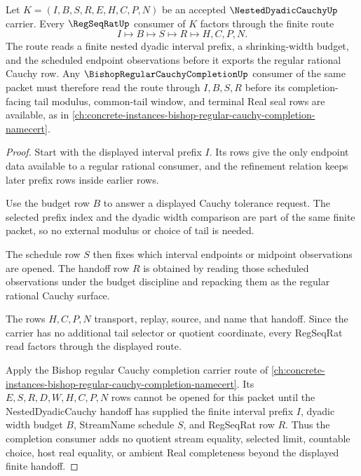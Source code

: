 \begin{theorem}
\label{thm:nested-dyadic-cauchy-regseqrat-handoff}
Let $K=(I,B,S,R,E,H,C,P,N)$ be an accepted $\NestedDyadicCauchyUp$ carrier. Every $\RegSeqRatUp$ consumer of $K$ factors through the finite route
$$
I\longmapsto B\longmapsto S\longmapsto R\longmapsto H,C,P,N .
$$
The route reads a finite nested dyadic interval prefix, a shrinking-width budget, and the scheduled endpoint observations before it exports the regular rational Cauchy row. Any $\BishopRegularCauchyCompletionUp$ consumer of the same packet must therefore read the route through $I,B,S,R$ before its completion-facing tail modulus, common-tail window, and terminal Real seal rows are available, as in \autoref{ch:concrete-instances-bishop-regular-cauchy-completion-namecert}.
\end{theorem}
\begin{proof}
Start with the displayed interval prefix $I$. Its rows give the only endpoint data available to a regular rational consumer, and the refinement relation keeps later prefix rows inside earlier rows.

Use the budget row $B$ to answer a displayed Cauchy tolerance request. The selected prefix index and the dyadic width comparison are part of the same finite packet, so no external modulus or choice of tail is needed.

The schedule row $S$ then fixes which interval endpoints or midpoint observations are opened. The handoff row $R$ is obtained by reading those scheduled observations under the budget discipline and repacking them as the regular rational Cauchy surface.

The rows $H,C,P,N$ transport, replay, source, and name that handoff. Since the carrier has no additional tail selector or quotient coordinate, every RegSeqRat read factors through the displayed route.

Apply the Bishop regular Cauchy completion carrier route of \autoref{ch:concrete-instances-bishop-regular-cauchy-completion-namecert}. Its $E,S,R,D,W,H,C,P,N$ rows cannot be opened for this packet until the NestedDyadicCauchy handoff has supplied the finite interval prefix $I$, dyadic width budget $B$, StreamName schedule $S$, and RegSeqRat row $R$. Thus the completion consumer adds no quotient stream equality, selected limit, countable choice, host real equality, or ambient Real completeness beyond the displayed finite handoff.
\end{proof}

